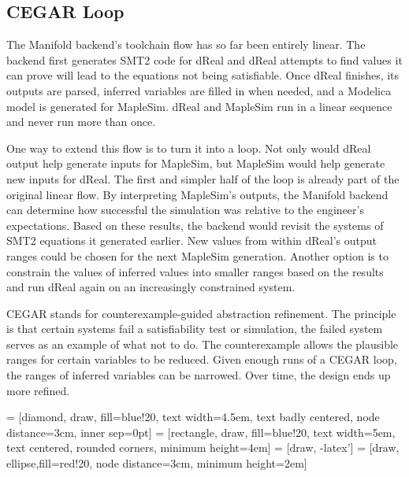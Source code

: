 \subsection{CEGAR Loop}

The Manifold backend's toolchain flow has so far been entirely linear.
The backend first generates SMT2 code for dReal and dReal attempts to find values it can prove will lead to the equations not being satisfiable.
Once dReal finishes, its outputs are parsed, inferred variables are filled in when needed, and a Modelica model is generated for MapleSim.
dReal and MapleSim run in a linear sequence and never run more than once.

One way to extend this flow is to turn it into a loop.
Not only would dReal output help generate inputs for MapleSim, but MapleSim would help generate new inputs for dReal.
The first and simpler half of the loop is already part of the original linear flow.
By interpreting MapleSim's outputs, the Manifold backend can determine how successful the simulation was relative to the engineer's expectations.
Based on these results, the backend would revisit the systems of SMT2 equations it generated earlier.
New values from within dReal's output ranges could be chosen for the next MapleSim generation.
Another option is to constrain the values of inferred values into smaller ranges based on the results and run dReal again on an increasingly constrained system.

CEGAR stands for counterexample-guided abstraction refinement.
The principle is that certain systems fail a satisfiability test or simulation, the failed system serves as an example of what not to do.
The counterexample allows the plausible ranges for certain variables to be reduced.
Given enough runs of a CEGAR loop, the ranges of inferred variables can be narrowed.
Over time, the design ends up more refined.

 = [diamond, draw, fill=blue!20, 
    text width=4.5em, text badly centered, node distance=3cm, inner sep=0pt]
 = [rectangle, draw, fill=blue!20, 
    text width=5em, text centered, rounded corners, minimum height=4em]
 = [draw, -latex']
 = [draw, ellipse,fill=red!20, node distance=3cm,
    minimum height=2em]

